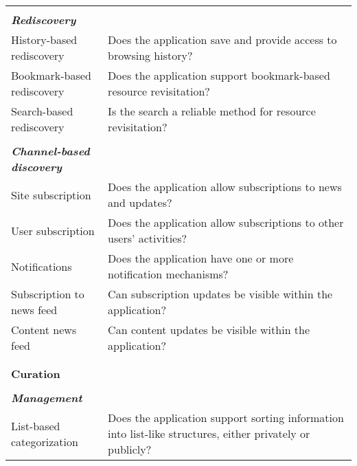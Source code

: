 \documentclass{casconpaper}
\begin{document}
{{\begin{table*}[htbp]
\begin{tabular}{|p{0.28\linewidth}|p{0.72\linewidth}|}
&\\
\emph{\textbf{Rediscovery}}                     &                                                                                                           \\
History-based rediscovery    & Does the application save and provide access to browsing history?                                        \\
Bookmark-based rediscovery   & Does the application support bookmark-based resource revisitation?                                        \\
Search-based rediscovery     & Is the search a reliable method for resource revisitation?                             \\
&\\
\emph{\textbf{Channel-based discovery}}          &                                                                                                           \\
Site subscription            & Does the application allow subscriptions to news and updates?                                             \\
User subscription             & Does the application allow subscriptions to other users' activities?                                      \\
Notifications                & Does the application have one or more notification mechanisms?                                                      \\
Subscription to news feed                  & Can subscription updates be visible within the application?  \\
Content news feed                  & Can content updates be visible within the application? \\
&\\
\hline     
&\\                                        
\textbf{\large{Curation}}                     &                                                                                                        \\     
&\\  
\emph{\textbf{Management}}                    &                                                                                                           \\
List-based categorization               & Does the application support sorting information into list-like structures, either privately or publicly?                                                  \\

\end{tabular}
\end{table*}}}
\end{document}
